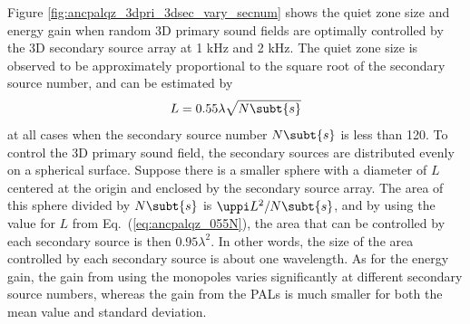 Figure \ref{fig:ancpalqz_3dpri_3dsec_vary_secnum} shows the quiet zone size and energy gain when random 3D primary sound fields are optimally controlled by the 3D secondary source array at 1 kHz and 2 kHz. 
The quiet zone size is observed to be approximately proportional to the square root of the secondary source number, and can be estimated by
\begin{equation}
    L = 0.55\lambda \sqrt{N\subt{s}}
    \label{eq:ancpalqz_055N}
\end{equation}
at all cases when the secondary source number $N\subt{s}$ is less than 120. 
To control the 3D primary sound field, the secondary sources are distributed evenly on a spherical surface. 
Suppose there is a smaller sphere with a diameter of $L$ centered at the origin and enclosed by the secondary source array. 
The area of this sphere divided by $N\subt{s}$ is $\uppi L^2/N\subt{s}$, and by using the value for $L$ from Eq.~(\ref{eq:ancpalqz_055N}), 
the area that can be controlled by each secondary source is then $0.95\lambda^2$. 
In other words, the size of the area controlled by each secondary source is about one wavelength. 
As for the energy gain, the gain from using the monopoles varies significantly at different secondary source numbers, whereas the gain from the PALs is much smaller for both the mean value and standard deviation.


